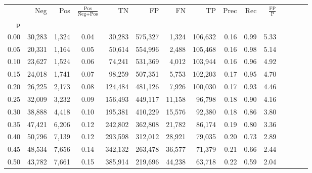 \begin{tabular}{rrrcrrrrrrrrrrr}
\toprule
{} &     Neg &    Pos & $\frac{\text{Pos}}{\text{Neg}+\text{Pos}}$ &       TN &       FP &       FN &       TP &  Prec &   Rec & $\frac{\text{FP}}{\text{P}}$ \\
p    &         &        &                                            &          &          &          &          &       &       &                              \\
\midrule
0.00 &  30,283 &  1,324 &                                       0.04 &   30,283 &  575,327 &    1,324 &  106,632 &  0.16 &  0.99 &                         5.33 \\
0.05 &  20,331 &  1,164 &                                       0.05 &   50,614 &  554,996 &    2,488 &  105,468 &  0.16 &  0.98 &                         5.14 \\
0.10 &  23,627 &  1,524 &                                       0.06 &   74,241 &  531,369 &    4,012 &  103,944 &  0.16 &  0.96 &                         4.92 \\
0.15 &  24,018 &  1,741 &                                       0.07 &   98,259 &  507,351 &    5,753 &  102,203 &  0.17 &  0.95 &                         4.70 \\
0.20 &  26,225 &  2,173 &                                       0.08 &  124,484 &  481,126 &    7,926 &  100,030 &  0.17 &  0.93 &                         4.46 \\
0.25 &  32,009 &  3,232 &                                       0.09 &  156,493 &  449,117 &   11,158 &   96,798 &  0.18 &  0.90 &                         4.16 \\
0.30 &  38,888 &  4,418 &                                       0.10 &  195,381 &  410,229 &   15,576 &   92,380 &  0.18 &  0.86 &                         3.80 \\
0.35 &  47,421 &  6,206 &                                       0.12 &  242,802 &  362,808 &   21,782 &   86,174 &  0.19 &  0.80 &                         3.36 \\
0.40 &  50,796 &  7,139 &                                       0.12 &  293,598 &  312,012 &   28,921 &   79,035 &  0.20 &  0.73 &                         2.89 \\
0.45 &  48,534 &  7,656 &                                       0.14 &  342,132 &  263,478 &   36,577 &   71,379 &  0.21 &  0.66 &                         2.44 \\
0.50 &  43,782 &  7,661 &                                       0.15 &  385,914 &  219,696 &   44,238 &   63,718 &  0.22 &  0.59 &                         2.04 \\

\end{tabular}
